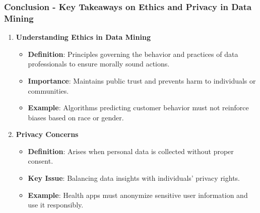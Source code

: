 \documentclass{beamer}
\begin{document}
\begin{frame}[fragile]
    \frametitle{Conclusion - Key Takeaways on Ethics and Privacy in Data Mining}
    
    \begin{enumerate}
        \item \textbf{Understanding Ethics in Data Mining}
        \begin{itemize}
            \item \textbf{Definition}: Principles governing the behavior and practices of data professionals to ensure morally sound actions.
            \item \textbf{Importance}: Maintains public trust and prevents harm to individuals or communities.
            \item \textbf{Example}: Algorithms predicting customer behavior must not reinforce biases based on race or gender.
        \end{itemize}

        \item \textbf{Privacy Concerns}
        \begin{itemize}
            \item \textbf{Definition}: Arises when personal data is collected without proper consent.
            \item \textbf{Key Issue}: Balancing data insights with individuals' privacy rights.
            \item \textbf{Example}: Health apps must anonymize sensitive user information and use it responsibly.
        \end{itemize}
    \end{enumerate}
\end{frame}
\end{document}
